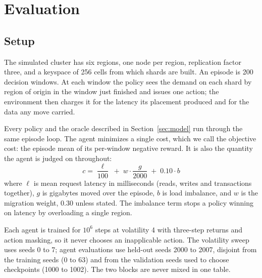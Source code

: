 
\section{Evaluation}

\subsection{Setup}

The simulated cluster has six regions, one node per region, replication
factor three, and a keyspace of 256 cells from which shards are built. An
episode is 200 decision windows. At each window the policy sees the demand on
each shard by region of origin in the window just finished and issues one
action; the environment then charges it for the latency its placement produced
and for the data any move carried.

Every policy and the oracle described in Section~\ref{sec:model} run through the same
episode loop. The agent minimizes a single cost, which we call the objective cost: the episode mean of its
per-window negative reward. It is also the quantity the agent is judged on throughout:
%
\begin{equation}
c = \frac{\ell}{100} \;+\; w \cdot \frac{g}{2000} \;+\; 0.10 \cdot b
\label{eq:objective}
\end{equation}
%
where $\ell$ is mean request latency in milliseconds (reads, writes and
transactions together), $g$ is gigabytes
moved over the episode, $b$ is load imbalance, and $w$ is the migration
weight, 0.30 unless stated. The imbalance term stops a policy winning on
latency by overloading a single region.

Each agent is trained for $10^6$ steps at volatility 4 with three-step returns
and action masking, so it never chooses an inapplicable action. The volatility
sweep uses seeds 0 to 7; agent evaluations use held-out seeds 2000 to 2007,
disjoint from the training seeds (0 to 63) and from the validation seeds used
to choose checkpoints (1000 to 1002). The two blocks are never mixed in one
table.


